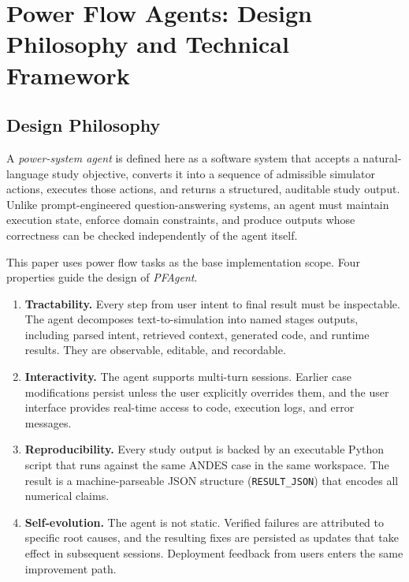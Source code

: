 \documentclass[journal]{IEEEtran}
\begin{document}

\section{Power Flow Agents: Design Philosophy and Technical Framework}
\label{sec:agent}

\subsection{Design Philosophy}

A \emph{power-system agent} is defined here as a software system that accepts a natural-language study objective, converts it into a sequence of admissible simulator actions, executes those actions, and returns a
structured, auditable study output.
Unlike prompt-engineered question-answering systems, an agent must maintain execution state, enforce domain constraints, and produce outputs whose correctness can be checked independently of the agent itself.

This paper uses power flow tasks as the base implementation scope. 
Four properties guide the design of \emph{PFAgent}.
\begin{enumerate}
\item \textbf{Tractability.}
      Every step from user intent to final result must be inspectable.
      The agent decomposes text-to-simulation into named stages outputs, including parsed intent, retrieved context, generated code, and runtime results. They are observable, editable, and recordable.
\item \textbf{Interactivity.}
      The agent supports multi-turn sessions.
      Earlier case modifications persist unless the user explicitly overrides them, and the user interface provides real-time access to code, execution logs, and error messages.
\item \textbf{Reproducibility.}
      Every study output is backed by an executable Python script that runs against the same ANDES case in the same workspace. The result is a machine-parseable JSON structure (\texttt{RESULT\_JSON}) that encodes all numerical claims.
\item \textbf{Self-evolution.}
      The agent is not static. Verified failures are attributed to specific root causes, and the resulting fixes are persisted as updates that take effect in subsequent sessions.
      Deployment feedback from users enters the same improvement path.
\end{enumerate}
\end{document}
